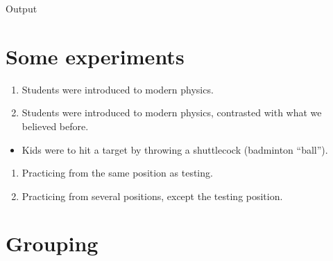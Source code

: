 \begin{frame}[fragile]\label{vtprogordcon}
  \begin{example}
  \end{example}

  \begin{block}{Output}
  \end{block}
\end{frame}


\section{Some experiments}

\begin{frame}\label{vtphysics}
  \begin{example}
    \begin{enumerate}
      \item Students were introduced to modern physics.
      \item Students were introduced to modern physics, contrasted with what we 
        believed before.
    \end{enumerate}
  \end{example}
\end{frame}

\begin{frame}\label{vtunknown}
  \begin{example}
    \begin{itemize}
      \item Kids were to hit a target by throwing a shuttlecock (badminton 
        \enquote{ball}).
    \end{itemize}
    \begin{enumerate}
      \item Practicing from the same position as testing.
      \item Practicing from several positions, except the testing position.
    \end{enumerate}
  \end{example}
\end{frame}

\section{Grouping}

